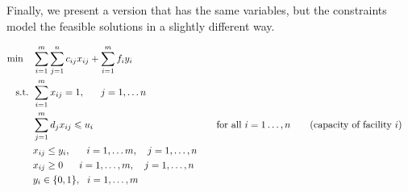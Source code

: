 Finally, we present a version that has the same variables, but the constraints model the feasible solutions in a slightly different way.

\begin{align*}
\min \quad & \sum_{i = 1}^m\sum_{j=1}^n c_{ij}x_{ij}+\sum_{i = 1}^mf_iy_i \\
\mbox{ s.t. }        & \sum_{i = 1}^mx_{ij} = 1,~~~~~j =1,\ldots n \\
& \displaystyle \sum_{j=1}^md_jx_{ij}\leqslant u_i &&\quad \mbox{for all } i=1\dots,n   \tag{capacity of facility $i$} \\
& x_{ij}\leq y_i,~~~~~ i = 1,\ldots m,~~~ j = 1,\ldots,n \\
& x_{ij} \geq 0~~~~~ i = 1,\ldots,m, ~~~j = 1,\ldots,n \\
& y_i\in \{0,1\}, \  \  i = 1,\ldots,m
\end{align*}

